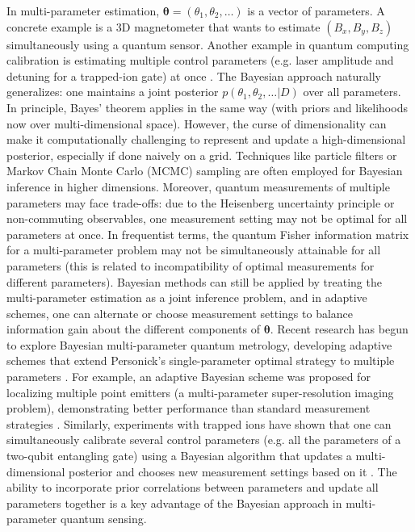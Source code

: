 In multi-parameter estimation, $\boldsymbol{\theta} = (\theta_1,
\theta_2, \dots)$ is a vector of parameters. A concrete example is a
3D magnetometer that wants to estimate $(B_x, B_y, B_z)$
simultaneously using a quantum sensor. Another example in quantum
computing calibration is estimating multiple control parameters
(e.g. laser amplitude and detuning for a trapped-ion gate) at once
. The Bayesian approach naturally generalizes: one maintains a joint
posterior $p(\theta_1,\theta_2,\dots | D)$ over all parameters. In
principle, Bayes’ theorem applies in the same way (with priors and
likelihoods now over multi-dimensional space). However, the curse of
dimensionality can make it computationally challenging to represent
and update a high-dimensional posterior, especially if done naively on
a grid. Techniques like particle filters or Markov Chain Monte Carlo
(MCMC) sampling are often employed for Bayesian inference in higher
dimensions. Moreover, quantum measurements of multiple parameters may
face trade-offs: due to the Heisenberg uncertainty principle or
non-commuting observables, one measurement setting may not be optimal
for all parameters at once. In frequentist terms, the quantum Fisher
information matrix for a multi-parameter problem may not be
simultaneously attainable for all parameters (this is related to
incompatibility of optimal measurements for different
parameters). Bayesian methods can still be applied by treating the
multi-parameter estimation as a joint inference problem, and in
adaptive schemes, one can alternate or choose measurement settings to
balance information gain about the different components of
$\boldsymbol{\theta}$. Recent research has begun to explore Bayesian
multi-parameter quantum metrology, developing adaptive schemes that
extend Personick’s single-parameter optimal strategy to multiple
parameters . For example, an adaptive Bayesian scheme was proposed for
localizing multiple point emitters (a multi-parameter super-resolution
imaging problem), demonstrating better performance than standard
measurement strategies . Similarly, experiments with trapped ions have
shown that one can simultaneously calibrate several control parameters
(e.g. all the parameters of a two-qubit entangling gate) using a
Bayesian algorithm that updates a multi-dimensional posterior and
chooses new measurement settings based on it . The ability to
incorporate prior correlations between parameters and update all
parameters together is a key advantage of the Bayesian approach in
multi-parameter quantum sensing.




